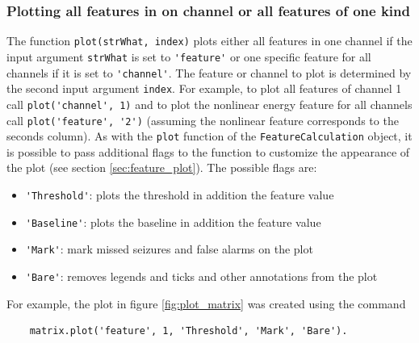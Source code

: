 \documentclass[usletter, 11pt]{extarticle}
\begin{document}
\subsubsection{Plotting all features in on channel or all features of one kind}

The function \verb|plot(strWhat, index)| plots either all features in one channel if the input argument \verb|strWhat| is set to \verb|'feature'| or one specific feature for all channels if it is set to \verb|'channel'|. The feature or channel to plot is determined by the second input argument \verb|index|. For example, to plot all features of channel 1 call \verb|plot('channel', 1)| and to plot the nonlinear energy feature for all channels call \verb|plot('feature', '2')| (assuming the nonlinear feature corresponds to the seconds column). As with the \verb|plot| function of the \texttt{FeatureCalcu\-lation} object, it is possible to pass additional flags to the function to customize the appearance of the plot (see section \ref{sec:feature_plot}). The possible flags are:
\begin{itemize}
	\item \verb|'Threshold'|: plots the threshold in addition the feature value
	\item \verb|'Baseline'|: plots the baseline in addition the feature value
	\item \verb|'Mark'|: mark missed seizures and false alarms on the plot
	\item \verb|'Bare'|: removes legends and ticks and other annotations from the plot
\end{itemize}

For example, the plot in figure \ref{fig:plot_matrix} was created using the command
\begin{Verbatim}
	matrix.plot('feature', 1, 'Threshold', 'Mark', 'Bare').
\end{Verbatim}
\end{document}
